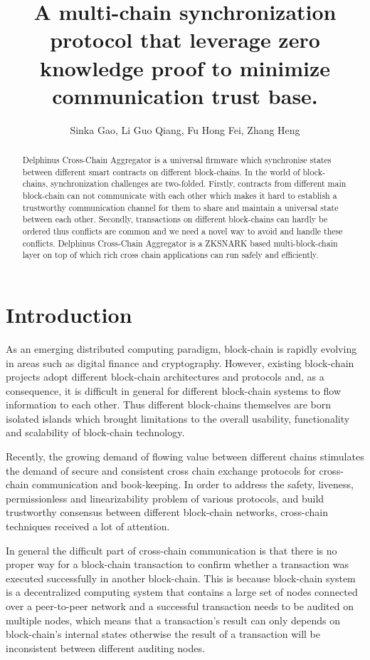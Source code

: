 \documentclass[pageno]{jpaper}
\begin{document}
\title{A multi-chain synchronization protocol that leverage zero knowledge proof to minimize communication trust base.}
\author{Sinka Gao, Li Guo Qiang, Fu Hong Fei, Zhang Heng}
\newcommand{\dprotocol}{Delphinus Cross-Chain Aggregator }
\date{}
\maketitle
\thispagestyle{empty}
\begin{abstract}
\dprotocol is a universal firmware which synchronise states between different smart contracts on different block-chains. In the world of block-chains, synchronization challenges are two-folded. Firstly, contracts from different main block-chain can not communicate with each other which makes it hard to establish a trustworthy communication channel for them to share and maintain a universal state between each other. Secondly, transactions on different block-chains can hardly be ordered thus conflicts are common and we need a novel way to avoid and handle these conflicts. \dprotocol is a ZKSNARK based multi-block-chain layer on top of which rich cross chain applications can run safely and efficiently.
\end{abstract}

\section{Introduction}
As an emerging distributed computing paradigm, block-chain is rapidly evolving in areas such as digital finance and cryptography. However, existing block-chain projects adopt different block-chain architectures and protocols and, as a consequence, it is difficult in general for different block-chain systems to flow information to each other. Thus different block-chains themselves are born isolated islands which brought limitations to the overall usability, functionality and scalability of block-chain technology. \cite{anati2013innovative}

Recently, the growing demand of flowing value between different chains stimulates the demand of secure and consistent cross chain exchange protocols for cross-chain communication and book-keeping.  In order to address the safety, liveness, permissionless and linearizability problem of various protocols, and build trustworthy consensus between different block-chain networks, cross-chain techniques received a lot of attention.

In general the difficult part of cross-chain communication is that there is no proper way for a block-chain transaction to confirm whether a transaction was executed successfully in another block-chain. This is because block-chain system is a decentralized computing system that contains a large set of nodes connected over a peer-to-peer network and a successful transaction needs to be audited on multiple nodes, which means that a transaction's result can only depends on block-chain's internal states otherwise the result of a transaction will be inconsistent between different auditing nodes. 
\end{document}
